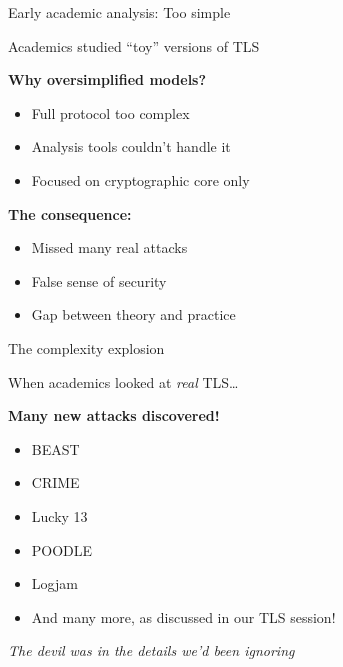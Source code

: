 \documentclass[aspectratio=169, lualatex, handout]{beamer}
\begin{document}
\begin{frame}{Early academic analysis: Too simple}
	\begin{center}
		\Large
		Academics studied ``toy'' versions of TLS
	\end{center}
	\vspace{1em}
	\textbf{Why oversimplified models?}
	\begin{itemize}
		\item Full protocol too complex
		\item Analysis tools couldn't handle it
		\item Focused on cryptographic core only
	\end{itemize}
	\vspace{0.5em}
	\textbf{The consequence:}
	\begin{itemize}
		\item Missed many real attacks
		\item False sense of security
		\item Gap between theory and practice
	\end{itemize}
\end{frame}

\begin{frame}{The complexity explosion}
	\begin{center}
		\Large
		When academics looked at \textit{real} TLS\ldots
	\end{center}
	\vspace{1em}
	\begin{center}
		\textbf{Many new attacks discovered!}
	\end{center}
	\vspace{0.5em}
	\begin{itemize}
		\item BEAST
		\item CRIME
		\item Lucky 13
		\item POODLE
		\item Logjam
		\item And many more, as discussed in our TLS session!
	\end{itemize}
	\vspace{0.5em}
	\begin{center}
		\textit{The devil was in the details we'd been ignoring}
	\end{center}
\end{frame}
\end{document}
